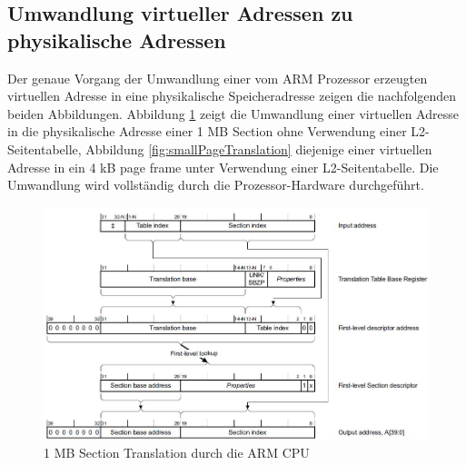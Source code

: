 \subsection{Umwandlung virtueller Adressen zu physikalische Adressen}

Der genaue Vorgang der Umwandlung einer vom ARM Prozessor erzeugten virtuellen Adresse in eine physikalische Speicheradresse zeigen die nachfolgenden beiden Abbildungen. Abbildung  \ref{fig:sectionTranslation} zeigt die Umwandlung einer virtuellen Adresse in die physikalische Adresse einer 1 MB Section ohne Verwendung einer L2-Seitentabelle, Abbildung \ref{fig:smallPageTranslation} diejenige einer virtuellen Adresse in ein 4 kB page frame unter Verwendung einer L2-Seitentabelle.   Die Umwandlung wird vollständig durch die Prozessor-Hardware durchgeführt.\\


\begin{figure}[H]
	\includegraphics[scale=0.8]{chapters/mmu/figures/sectionTranslation}
	\caption{1 MB Section Translation durch die ARM CPU \cite[S. B3-1335]{ARM:ARM}}
	\label{fig:sectionTranslation}
\end{figure}

